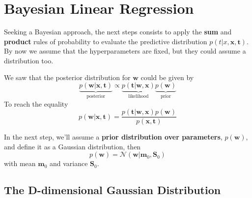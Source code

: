 \section{Bayesian Linear Regression}
\framecard{\insertsection}

\begin{frame}{\insertsection}
	Seeking a Bayesian approach, the next steps consists to apply the \textbf{sum} and \textbf{product} rules of probability to evaluate the predictive distribution $p \left( t|x,\mathbf{x},\mathbf{t} \right)$. By now we assume that the hyperparameters are fixed, but they could assume a distribution too. \\
\end{frame}

\begin{frame}{\insertsection}
	We saw that the posterior distribution for $\mathbf{w}$ could be given by
	\begin{equation*}
		\underbrace{p\left( \mathbf{w} | \mathbf{x}, \mathbf{t} \right)}_{\text{posterior}} \propto \underbrace{p\left(  \mathbf{t} |\mathbf{w} ,\mathbf{x} \right)}_{\text{likelihood}}  \underbrace{p\left( \mathbf{w} \right)}_{\text{prior}}
	\end{equation*}
	To reach the equality
	\begin{equation*}
		p\left( \mathbf{w} | \mathbf{x}, \mathbf{t} \right) = \frac{p\left(  \mathbf{t} |\mathbf{w} ,\mathbf{x} \right) p\left( \mathbf{w} \right)}{p( \mathbf{x},\mathbf{t})}
	\end{equation*}
\end{frame}

\begin{frame}{\insertsection}
In the next step, we'll assume a \textbf{prior distribution over parameters}, $p(\mathbf{w})$, and define it as a Gaussian distribution, then
\begin{equation*}
	p(\mathbf{w}) = \mathcal{N} \left( \mathbf{w} | \mathbf{m}_0, \mathbf{S}_0 \right)
\end{equation*}	
with mean $\mathbf{m}_0$ and variance $\mathbf{S}_0$.
\end{frame}

\subsection{The D-dimensional Gaussian Distribution}

